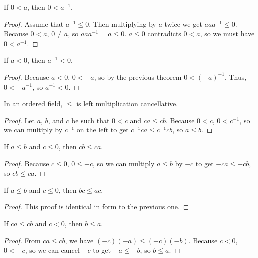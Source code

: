 \documentclass[../math.tex]{subfiles}
\begin{document}
\begin{theorem}
    If $0 < a$, then $0 < a^{-1}$.
\end{theorem}
\begin{proof}
    Assume that $a^{-1} \leq 0$. Then multiplying by $a$ twice we get $aaa^{-1}
    \leq 0$.  Because $0 < a$, $0 \neq a$, so $aaa^{-1} = a \leq 0$.  $a \leq 0$
    contradicts $0 < a$, so we must have $0 < a^{-1}$.
\end{proof}

\begin{theorem}
    If $a < 0$, then $a^{-1} < 0$.
\end{theorem}
\begin{proof}
    Because $a < 0$, $0 < -a$, so by the previous theorem $0 < (-a)^{-1}$.
    Thus, $0 < -a^{-1}$, so $a^{-1} < 0$.
\end{proof}

\begin{instance}
    In an ordered field, $\leq$ is left multiplication cancellative.
\end{instance}
\begin{proof}
    Let $a$, $b$, and $c$ be such that $0 < c$ and $ca \leq cb$.  Because $0 <
    c$, $0 < c^{-1}$, so we can multiply by $c^{-1}$ on the left to get
    $c^{-1}ca \leq c^{-1}cb$, so $a \leq b$.
\end{proof}

\begin{theorem} \label{le_lmult_neg}
    If $a \leq b$ and $c \leq 0$, then $cb \leq ca$.
\end{theorem}
\begin{proof}
    Because $c \leq 0$, $0 \leq -c$, so we can multiply $a \leq b$ by $-c$ to
    get $-ca \leq -cb$, so $cb \leq ca$.
\end{proof}

\begin{theorem} \label{le_rmult_neg}
    If $a \leq b$ and $c \leq 0$, then $bc \leq ac$.
\end{theorem}
\begin{proof}
    This proof is identical in form to the previous one.
\end{proof}

\begin{theorem} \label{le_mult_lcancel_neg}
    If $ca \leq cb$ and $c < 0$, then $b \leq a$.
\end{theorem}
\begin{proof}
    From $ca \leq cb$, we have $(-c)(-a) \leq (-c)(-b)$.  Because $c < 0$, $0 <
    -c$, so we can cancel $-c$ to get $-a \leq -b$, so $b \leq a$.
\end{proof}
\end{document}
